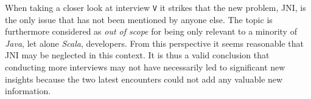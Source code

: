 When taking a closer look at interview \texttt{V} it strikes that the new problem, \ac{JNI}, is the only issue that has not been mentioned by anyone else. The topic is furthermore considered as \textit{out of scope} for being only relevant to a minority of \textit{Java}, let alone \textit{Scala}, developers. From this perspective it seems reasonable that \ac{JNI} may be neglected in this context. It is thus a valid conclusion that conducting more interviews may not have necessarily led to significant new insights because the two latest encounters could not add any valuable new information.